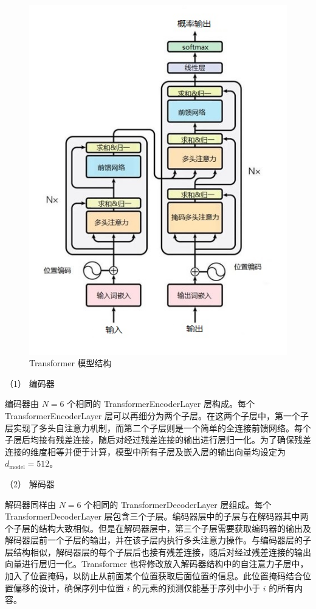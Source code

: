 \begin{figure}[htb]
	\centering
	\includegraphics[scale = 0.8]{figures/Transformer2}
	\caption{Transformer 模型结构 \cite{transformer}}
	\label{fig:Transformer2}
\end{figure}


（1） 编码器

编码器由 \(N=6\) 个相同的 TransformerEncoderLayer 层构成。每个 TransformerEncoderLayer 层可以再细分为两个子层。在这两个子层中，第一个子层实现了多头自注意力机制，而第二个子层则是一个简单的全连接前馈网络。每个子层后均接有残差连接，随后对经过残差连接的输出进行层归一化。为了确保残差连接的维度相等并便于计算，模型中所有子层及嵌入层的输出向量均设定为 \(d_{\text{model}} = 512\)。

（2） 解码器

解码器同样由 \(N=6\) 个相同的 TransformerDecoderLayer 层组成。每个 TransformerDecoderLayer 层包含三个子层。编码器层中的子层与在解码器其中两个子层的结构大致相似。但是在解码器层中，第三个子层需要获取编码器的输出及解码器层前一个子层的输出，并在该子层内执行多头注意力操作。与编码器层的子层结构相似，解码器层的每个子层后也接有残差连接，随后对经过残差连接的输出向量进行层归一化。Transformer 也将修改放入解码器结构中的自注意力子层中，加入了位置掩码，以防止从前面某个位置获取后面位置的信息。此位置掩码结合位置偏移的设计，确保序列中位置 \(i\) 的元素的预测仅能基于序列中小于 \(i\) 的所有内容。

